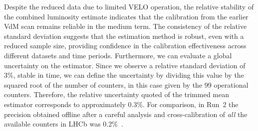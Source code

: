 Despite the reduced data due to limited VELO operation, the relative stability of the combined luminosity estimate indicates that the calibration from the earlier VdM scan remains reliable in the medium term. The consistency of the relative standard deviation suggests that the estimation method is robust, even with a reduced sample size, providing confidence in the calibration effectiveness across different datasets and time periods.
Furthermore, we can evaluate a global uncertainty on the estimator. Since we observe a relative standard deviation of 3\%, stable in time, we can define the uncertainty by dividing this value by the squared root of the number of counters, in this case given by the 99 operational counters. Therefore, the relative uncertainty quoted of the trimmed mean estimator corresponds to approximately 0.3\%. For comparison, in Run~2 the precision obtained offline after a careful analysis and cross-calibration of \textit{all} the available counters in LHCb was 0.2\%~\cite{lumi2}.